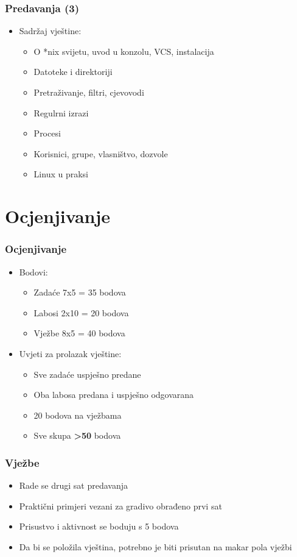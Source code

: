 \documentclass{beamer}
\begin{document}
\begin{frame}[t]
\frametitle{Predavanja (3)}
\begin{itemize}
	\item Sadržaj vještine:
	\begin{itemize}
		\item O *nix svijetu, uvod u konzolu, VCS, instalacija 
		\item Datoteke i direktoriji
		\item Pretraživanje, filtri, cjevovodi
    \item Regulrni izrazi 
		\item Procesi
		\item Korisnici, grupe, vlasništvo, dozvole
		\item Linux u praksi 
	\end{itemize}
\end{itemize}
\end{frame}

\section{Ocjenjivanje}
\begin{frame}[t]
\frametitle{Ocjenjivanje}
\begin{itemize}
	\item Bodovi:
	\begin{itemize}
		\item Zadaće 7x5  = 35 bodova
		\item Labosi 2x10 = 20 bodova
		\item Vježbe 8x5  = 40 bodova
	\end{itemize}
	\item Uvjeti za prolazak vještine:
	\begin{itemize}
		\item Sve zadaće uspješno predane
		\item Oba labosa predana i uspješno odgovarana
		\item 20 bodova na vježbama
		\item Sve skupa \textbf{\textgreater 50} bodova
	\end{itemize}
\end{itemize}
\end{frame}

\begin{frame}[t]
\frametitle{Vježbe}
\begin{itemize}
	\item Rade se drugi sat predavanja
	\item Praktični primjeri vezani za gradivo obrađeno prvi sat
	\item Prisustvo i aktivnost se boduju s 5 bodova
	\item Da bi se položila vještina, potrebno je biti prisutan na makar pola vježbi
\end{itemize}
\end{frame}
\end{document}
